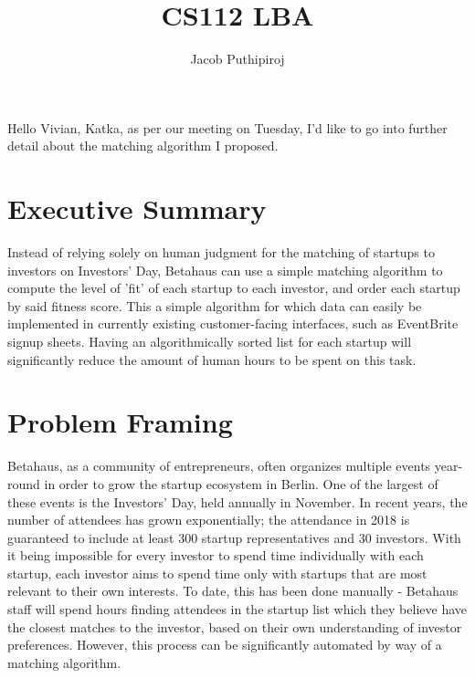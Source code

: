 \documentclass{article}
\begin{document}
\title{CS112 LBA}
\author{Jacob Puthipiroj}
\date{}
\maketitle

Hello Vivian, Katka, as per our meeting on Tuesday, I'd like to go into further detail about the matching algorithm I proposed.

\section*{Executive Summary}
Instead of relying solely on human judgment for the matching of startups to investors on Investors' Day, Betahaus can use a simple matching algorithm to compute the level of 'fit' of each startup to each investor, and order each startup by said fitness score. This a simple algorithm for which data can easily be implemented in currently existing customer-facing interfaces, such as EventBrite signup sheets. Having an algorithmically sorted list for each startup will significantly reduce the amount of human hours to be spent on this task.

\section*{Problem Framing}
Betahaus, as a community of entrepreneurs, often organizes multiple events year-round in order to grow the startup ecosystem in Berlin. One of the largest of these events is the Investors' Day, held annually in November. In recent years, the number of attendees has grown exponentially; the attendance in 2018 is guaranteed to include at least 300 startup representatives and 30 investors. With it being impossible for every investor to spend time individually with each startup, each investor aims to spend time only with startups that are most relevant to their own interests. To date, this has been done manually - Betahaus staff will spend hours finding attendees in the startup list which they believe have the closest matches to the investor, based on their own understanding of investor preferences. However, this process can be significantly automated by way of a matching algorithm.
 
\end{document}
